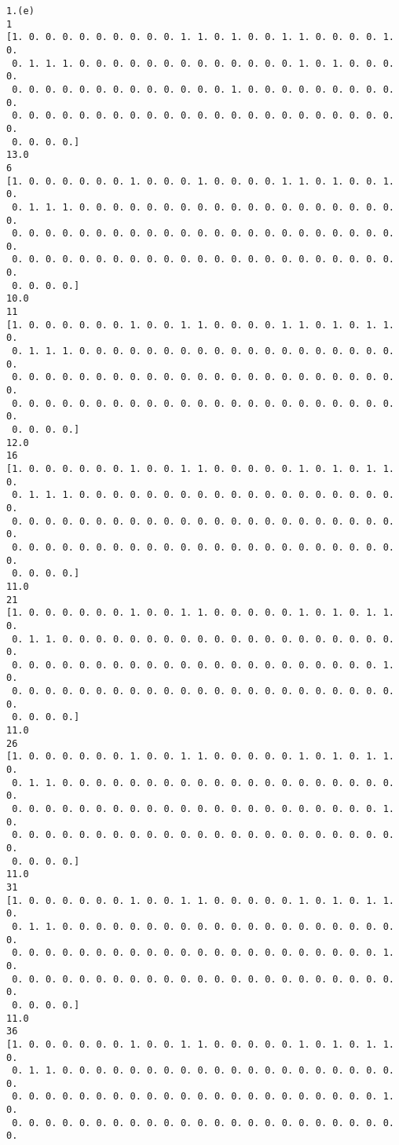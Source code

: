 \documentclass[11pt]{article}
\begin{document}
    \begin{Verbatim}[commandchars=\\\{\}]
1.(e)
1
[1. 0. 0. 0. 0. 0. 0. 0. 0. 0. 1. 1. 0. 1. 0. 0. 1. 1. 0. 0. 0. 0. 1. 0.
 0. 1. 1. 1. 0. 0. 0. 0. 0. 0. 0. 0. 0. 0. 0. 0. 0. 1. 0. 1. 0. 0. 0. 0.
 0. 0. 0. 0. 0. 0. 0. 0. 0. 0. 0. 0. 0. 1. 0. 0. 0. 0. 0. 0. 0. 0. 0. 0.
 0. 0. 0. 0. 0. 0. 0. 0. 0. 0. 0. 0. 0. 0. 0. 0. 0. 0. 0. 0. 0. 0. 0. 0.
 0. 0. 0. 0.]
13.0
6
[1. 0. 0. 0. 0. 0. 0. 1. 0. 0. 0. 1. 0. 0. 0. 0. 1. 1. 0. 1. 0. 0. 1. 0.
 0. 1. 1. 1. 0. 0. 0. 0. 0. 0. 0. 0. 0. 0. 0. 0. 0. 0. 0. 0. 0. 0. 0. 0.
 0. 0. 0. 0. 0. 0. 0. 0. 0. 0. 0. 0. 0. 0. 0. 0. 0. 0. 0. 0. 0. 0. 0. 0.
 0. 0. 0. 0. 0. 0. 0. 0. 0. 0. 0. 0. 0. 0. 0. 0. 0. 0. 0. 0. 0. 0. 0. 0.
 0. 0. 0. 0.]
10.0
11
[1. 0. 0. 0. 0. 0. 0. 1. 0. 0. 1. 1. 0. 0. 0. 0. 1. 1. 0. 1. 0. 1. 1. 0.
 0. 1. 1. 1. 0. 0. 0. 0. 0. 0. 0. 0. 0. 0. 0. 0. 0. 0. 0. 0. 0. 0. 0. 0.
 0. 0. 0. 0. 0. 0. 0. 0. 0. 0. 0. 0. 0. 0. 0. 0. 0. 0. 0. 0. 0. 0. 0. 0.
 0. 0. 0. 0. 0. 0. 0. 0. 0. 0. 0. 0. 0. 0. 0. 0. 0. 0. 0. 0. 0. 0. 0. 0.
 0. 0. 0. 0.]
12.0
16
[1. 0. 0. 0. 0. 0. 0. 1. 0. 0. 1. 1. 0. 0. 0. 0. 0. 1. 0. 1. 0. 1. 1. 0.
 0. 1. 1. 1. 0. 0. 0. 0. 0. 0. 0. 0. 0. 0. 0. 0. 0. 0. 0. 0. 0. 0. 0. 0.
 0. 0. 0. 0. 0. 0. 0. 0. 0. 0. 0. 0. 0. 0. 0. 0. 0. 0. 0. 0. 0. 0. 0. 0.
 0. 0. 0. 0. 0. 0. 0. 0. 0. 0. 0. 0. 0. 0. 0. 0. 0. 0. 0. 0. 0. 0. 0. 0.
 0. 0. 0. 0.]
11.0
21
[1. 0. 0. 0. 0. 0. 0. 1. 0. 0. 1. 1. 0. 0. 0. 0. 0. 1. 0. 1. 0. 1. 1. 0.
 0. 1. 1. 0. 0. 0. 0. 0. 0. 0. 0. 0. 0. 0. 0. 0. 0. 0. 0. 0. 0. 0. 0. 0.
 0. 0. 0. 0. 0. 0. 0. 0. 0. 0. 0. 0. 0. 0. 0. 0. 0. 0. 0. 0. 0. 0. 1. 0.
 0. 0. 0. 0. 0. 0. 0. 0. 0. 0. 0. 0. 0. 0. 0. 0. 0. 0. 0. 0. 0. 0. 0. 0.
 0. 0. 0. 0.]
11.0
26
[1. 0. 0. 0. 0. 0. 0. 1. 0. 0. 1. 1. 0. 0. 0. 0. 0. 1. 0. 1. 0. 1. 1. 0.
 0. 1. 1. 0. 0. 0. 0. 0. 0. 0. 0. 0. 0. 0. 0. 0. 0. 0. 0. 0. 0. 0. 0. 0.
 0. 0. 0. 0. 0. 0. 0. 0. 0. 0. 0. 0. 0. 0. 0. 0. 0. 0. 0. 0. 0. 0. 1. 0.
 0. 0. 0. 0. 0. 0. 0. 0. 0. 0. 0. 0. 0. 0. 0. 0. 0. 0. 0. 0. 0. 0. 0. 0.
 0. 0. 0. 0.]
11.0
31
[1. 0. 0. 0. 0. 0. 0. 1. 0. 0. 1. 1. 0. 0. 0. 0. 0. 1. 0. 1. 0. 1. 1. 0.
 0. 1. 1. 0. 0. 0. 0. 0. 0. 0. 0. 0. 0. 0. 0. 0. 0. 0. 0. 0. 0. 0. 0. 0.
 0. 0. 0. 0. 0. 0. 0. 0. 0. 0. 0. 0. 0. 0. 0. 0. 0. 0. 0. 0. 0. 0. 1. 0.
 0. 0. 0. 0. 0. 0. 0. 0. 0. 0. 0. 0. 0. 0. 0. 0. 0. 0. 0. 0. 0. 0. 0. 0.
 0. 0. 0. 0.]
11.0
36
[1. 0. 0. 0. 0. 0. 0. 1. 0. 0. 1. 1. 0. 0. 0. 0. 0. 1. 0. 1. 0. 1. 1. 0.
 0. 1. 1. 0. 0. 0. 0. 0. 0. 0. 0. 0. 0. 0. 0. 0. 0. 0. 0. 0. 0. 0. 0. 0.
 0. 0. 0. 0. 0. 0. 0. 0. 0. 0. 0. 0. 0. 0. 0. 0. 0. 0. 0. 0. 0. 0. 1. 0.
 0. 0. 0. 0. 0. 0. 0. 0. 0. 0. 0. 0. 0. 0. 0. 0. 0. 0. 0. 0. 0. 0. 0. 0.

\end{Verbatim}
\end{document}
